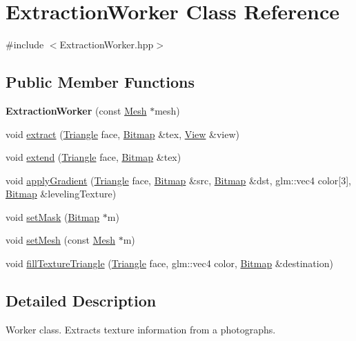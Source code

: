 \hypertarget{class_extraction_worker}{}\section{Extraction\+Worker Class Reference}
\label{class_extraction_worker}


{\ttfamily \#include $<$Extraction\+Worker.\+hpp$>$}

\subsection*{Public Member Functions}
\begin{DoxyCompactItemize}
\item 
\hypertarget{class_extraction_worker_a5cb5231da6a9c3568c1cbdeaa90a30e2}{}{\bfseries Extraction\+Worker} (const \hyperlink{class_mesh}{Mesh} $\ast$mesh)\label{class_extraction_worker_a5cb5231da6a9c3568c1cbdeaa90a30e2}

\item 
void \hyperlink{class_extraction_worker_ad649a3ebbc506e55d5b003381b07ba06}{extract} (\hyperlink{struct_triangle}{Triangle} face, \hyperlink{class_bitmap}{Bitmap} \&tex, \hyperlink{class_view}{View} \&view)
\item 
void \hyperlink{class_extraction_worker_a24312158a7768088b96dd722414786ae}{extend} (\hyperlink{struct_triangle}{Triangle} face, \hyperlink{class_bitmap}{Bitmap} \&tex)
\item 
void \hyperlink{class_extraction_worker_ac956797cff498d82f040d3884be2144d}{apply\+Gradient} (\hyperlink{struct_triangle}{Triangle} face, \hyperlink{class_bitmap}{Bitmap} \&src, \hyperlink{class_bitmap}{Bitmap} \&dst, glm\+::vec4 color\mbox{[}3\mbox{]}, \hyperlink{class_bitmap}{Bitmap} \&leveling\+Texture)
\item 
void \hyperlink{class_extraction_worker_a3ae8fdacd8e2a0b44873c36b6e3756e5}{set\+Mask} (\hyperlink{class_bitmap}{Bitmap} $\ast$m)
\item 
void \hyperlink{class_extraction_worker_a0bfb06fd0caed6ec032416e8d928fbe8}{set\+Mesh} (const \hyperlink{class_mesh}{Mesh} $\ast$m)
\item 
void \hyperlink{class_extraction_worker_a25d7438c2adfc4e4e4076954516a4f43}{fill\+Texture\+Triangle} (\hyperlink{struct_triangle}{Triangle} face, glm\+::vec4 color, \hyperlink{class_bitmap}{Bitmap} \&destination)
\end{DoxyCompactItemize}


\subsection{Detailed Description}
Worker class. Extracts texture information from a photographs. 

